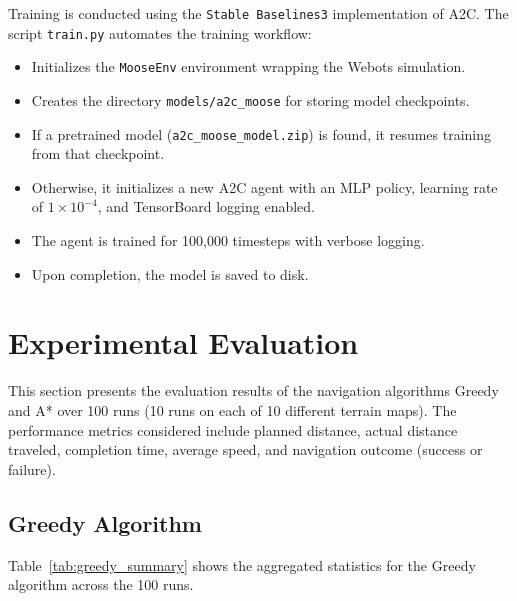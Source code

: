 \documentclass[11pt,twocolumn]{article}
\begin{document}
Training is conducted using the \texttt{Stable Baselines3} implementation of A2C. The script \texttt{train.py} automates the training workflow:

\begin{itemize}
    \item Initializes the \texttt{MooseEnv} environment wrapping the Webots simulation.
    \item Creates the directory \texttt{models/a2c\_moose} for storing model checkpoints.
    \item If a pretrained model (\texttt{a2c\_moose\_model.zip}) is found, it resumes training from that checkpoint.
    \item Otherwise, it initializes a new A2C agent with an MLP policy, learning rate of $1 \times 10^{-4}$, and TensorBoard logging enabled.
    \item The agent is trained for 100,000 timesteps with verbose logging.
    \item Upon completion, the model is saved to disk.
\end{itemize}

\section{Experimental Evaluation}

This section presents the evaluation results of the navigation algorithms Greedy and A* over 100 runs (10 runs on each of 10 different terrain maps). The performance metrics considered include planned distance, actual distance traveled, completion time, average speed, and navigation outcome (success or failure).

\subsection{Greedy Algorithm}

Table~\ref{tab:greedy_summary} shows the aggregated statistics for the Greedy algorithm across the 100 runs.

\begin{table}[ht]
\centering
\caption{Summary statistics for the Greedy algorithm (100 runs).}
\label{tab:greedy_summary}
\end{table}
\end{document}
